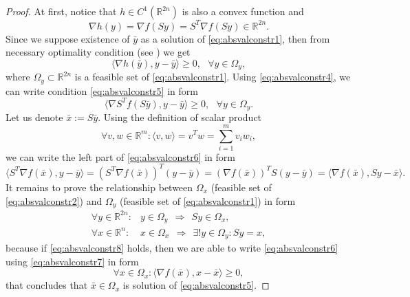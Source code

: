 \begin{proof}
At first, notice that $h \in C^1(\mathbb{R}^{2n})$ is also a convex function and
\begin{equation}
  \label{eq:absvalconstr4}
  \nabla h(y) = \nabla f(Sy) = S^T \nabla f(Sy) \in \mathbb{R}^{2n}.
\end{equation}
Since we suppose existence of $\bar{y}$ as a solution of \eqref{eq:absvalconstr1}, then from necessary optimality condition (see )
we get
\begin{equation}
 \label{eq:absvalconstr5}
  \langle \nabla h(\bar{y}), y - \bar{y} \rangle \geq 0, ~~~ \forall y \in \Omega_y,
\end{equation}
where $\Omega_y \subset \mathbb{R}^{2n}$ is a feasible set of \eqref{eq:absvalconstr1}. Using \eqref{eq:absvalconstr4}, we can write condition \eqref{eq:absvalconstr5}
in form
\begin{equation}
 \label{eq:absvalconstr6}
  \langle \nabla S^T f(S \bar{y}), y - \bar{y} \rangle \geq 0, ~~~ \forall y \in \Omega_y.
\end{equation}
Let us denote $\bar{x} := S \bar{y}$. Using the definition of scalar product
\begin{displaymath}
 \forall v,w \in \mathbb{R}^m: \langle v,w \rangle = v^T w = \sum\limits_{i = 1}^{m} v_i w_i,
\end{displaymath}
we can write the left part of \eqref{eq:absvalconstr6} in form
\begin{equation}
 \label{eq:absvalconstr7}
 \langle S^T \nabla f(\bar{x}), y - \bar{y} \rangle
 = \left( S^T \nabla f(\bar{x}) \right)^T \left( y - \bar{y} \right)
 = \left( \nabla f(\bar{x}) \right)^T S \left( y - \bar{y} \right)
 = \langle \nabla f(\bar{x}), Sy - \bar{x} \rangle.
\end{equation}
It remains to prove the relationship between $\Omega_x$ (feasible set of \eqref{eq:absvalconstr2}) and $\Omega_y$ (feasible set of \eqref{eq:absvalconstr1}) in form
\begin{equation}
 \label{eq:absvalconstr8}
 \begin{array}{ll}
  \forall y \in \mathbb{R}^{2n}: & y \in \Omega_y ~~ \Rightarrow ~~ Sy \in \Omega_x, \\
  \forall x \in \mathbb{R}^{n}: & x \in \Omega_x ~~ \Rightarrow ~~ \exists ! y \in \Omega_y: Sy = x, 
 \end{array}
\end{equation}
because if \eqref{eq:absvalconstr8} holds, then we are able to write \eqref{eq:absvalconstr6} using \eqref{eq:absvalconstr7} in form
\begin{displaymath}
 \forall x \in \Omega_x: \langle \nabla f(\bar{x}), x - \bar{x} \rangle \geq 0,
\end{displaymath}
that concludes that $\bar{x} \in \Omega_x$ is solution of \eqref{eq:absvalconstr5}.\newline


\end{proof}
